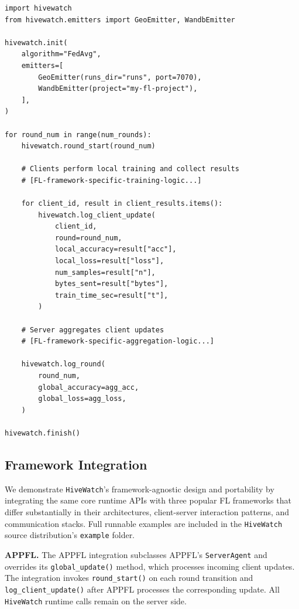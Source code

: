 \documentclass[preprint,12pt, a4paper]{elsarticle}
\begin{document}
\begin{lstlisting}[style=PythonStyle,caption={Minimal \texttt{HiveWatch} integration into an FL server loop.}]
import hivewatch
from hivewatch.emitters import GeoEmitter, WandbEmitter

hivewatch.init(
    algorithm="FedAvg",
    emitters=[
        GeoEmitter(runs_dir="runs", port=7070),
        WandbEmitter(project="my-fl-project"),
    ],
)

for round_num in range(num_rounds):
    hivewatch.round_start(round_num)

    # Clients perform local training and collect results
    # [FL-framework-specific-training-logic...]
    
    for client_id, result in client_results.items():
        hivewatch.log_client_update(
            client_id,
            round=round_num,
            local_accuracy=result["acc"],
            local_loss=result["loss"],
            num_samples=result["n"],
            bytes_sent=result["bytes"],
            train_time_sec=result["t"],
        )

    # Server aggregates client updates
    # [FL-framework-specific-aggregation-logic...]

    hivewatch.log_round(
        round_num,
        global_accuracy=agg_acc,
        global_loss=agg_loss,
    )

hivewatch.finish()
\end{lstlisting}

\subsection{Framework Integration}

We demonstrate \texttt{HiveWatch}'s framework-agnostic design and portability by integrating the same core runtime APIs with three popular FL frameworks that differ substantially in their architectures, client-server interaction patterns, and communication stacks. Full runnable examples are included in the \texttt{HiveWatch} source distribution's \texttt{example} folder.

\textbf{APPFL.} The APPFL integration subclasses APPFL's \texttt{ServerAgent} and overrides its \texttt{global\_update()} method, which processes incoming client updates. The integration invokes \texttt{round\_start()} on each round transition and \texttt{log\_client\_update()} after APPFL processes the corresponding update. All \texttt{HiveWatch} runtime calls remain on the server side.
\end{document}
